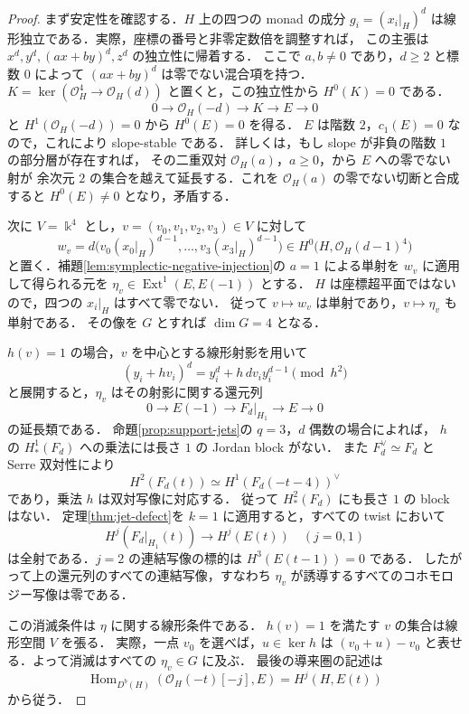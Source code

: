 \documentclass[a4paper,11pt]{ltjsarticle}
\numberwithin{equation}{section}
\theoremstyle{plain}
\theoremstyle{definition}
\theoremstyle{remark}
\begin{document}
\begin{proof}
まず安定性を確認する．$H$ 上の四つの monad の成分
$g_i=(x_i|_H)^d$ は線形独立である．実際，座標の番号と非零定数倍を調整すれば，
この主張は $x^d,y^d,(a x+b y)^d,z^d$ の独立性に帰着する．
ここで $a,b\ne0$ であり，$d\geq2$ と標数 $0$ によって
$(a x+b y)^d$ は零でない混合項を持つ．
$K=\ker(\mathcal O_H^4\to\mathcal O_H(d))$ と置くと，この独立性から
$H^0(K)=0$ である．
\[
 0\longrightarrow\mathcal O_H(-d)\longrightarrow K\longrightarrow E\longrightarrow0
\]
と $H^1(\mathcal O_H(-d))=0$ から $H^0(E)=0$ を得る．
$E$ は階数 $2$，$c_1(E)=0$ なので，これにより slope-stable である．
詳しくは，もし slope が非負の階数 $1$ の部分層が存在すれば，
その二重双対 $\mathcal O_H(a)$，$a\geq0$，から $E$ への零でない射が
余次元 $2$ の集合を越えて延長する．これを $\mathcal O_H(a)$ の零でない切断と合成すると
$H^0(E)\ne0$ となり，矛盾する．

次に $V=\Bbbk^4$ とし，$v=(v_0,v_1,v_2,v_3)\in V$ に対して
\[
 w_v=d\bigl(v_0(x_0|_H)^{d-1},\ldots,v_3(x_3|_H)^{d-1}\bigr)
 \in H^0\bigl(H,\mathcal O_H(d-1)^4\bigr)
\]
と置く．補題\ref{lem:symplectic-negative-injection}の $a=1$ による単射を
$w_v$ に適用して得られる元を $\eta_v\in\operatorname{Ext}^1(E,E(-1))$ とする．
$H$ は座標超平面ではないので，四つの $x_i|_H$ はすべて零でない．
従って $v\mapsto w_v$ は単射であり，$v\mapsto\eta_v$ も単射である．
その像を $G$ とすれば $\dim G=4$ となる．

$h(v)=1$ の場合，$v$ を中心とする線形射影を用いて
\[
 (y_i+h v_i)^d=y_i^d+h\,d v_i y_i^{d-1}\pmod{h^2}
\]
と展開すると，$\eta_v$ はその射影に関する還元列
\[
 0\longrightarrow E(-1)\longrightarrow F_d|_{H_1}
 \longrightarrow E\longrightarrow0
\]
の延長類である．
命題\ref{prop:support-jets}の $q=3$，$d$ 偶数の場合によれば，
$h$ の $H^1_*(F_d)$ への乗法には長さ $1$ の Jordan block がない．
また $F_d^\vee\simeq F_d$ と Serre 双対性により
\[
 H^2(F_d(t))\simeq H^1(F_d(-t-4))^\vee
\]
であり，乗法 $h$ は双対写像に対応する．
従って $H^2_*(F_d)$ にも長さ $1$ の block はない．
定理\ref{thm:jet-defect}を $k=1$ に適用すると，すべての twist において
\[
 H^j(F_d|_{H_1}(t))\longrightarrow H^j(E(t))
 \quad(j=0,1)
\]
は全射である．$j=2$ の連結写像の標的は $H^3(E(t-1))=0$ である．
したがって上の還元列のすべての連結写像，すなわち
$\eta_v$ が誘導するすべてのコホモロジー写像は零である．

この消滅条件は $\eta$ に関する線形条件である．
$h(v)=1$ を満たす $v$ の集合は線形空間 $V$ を張る．
実際，一点 $v_0$ を選べば，$u\in\ker h$ は
$(v_0+u)-v_0$ と表せる．よって消滅はすべての $\eta_v\in G$ に及ぶ．
最後の導来圏の記述は
\[
 \operatorname{Hom}_{D^b(H)}(\mathcal O_H(-t)[-j],E)
 =H^j(H,E(t))
\]
から従う．
\end{proof}
\end{document}
